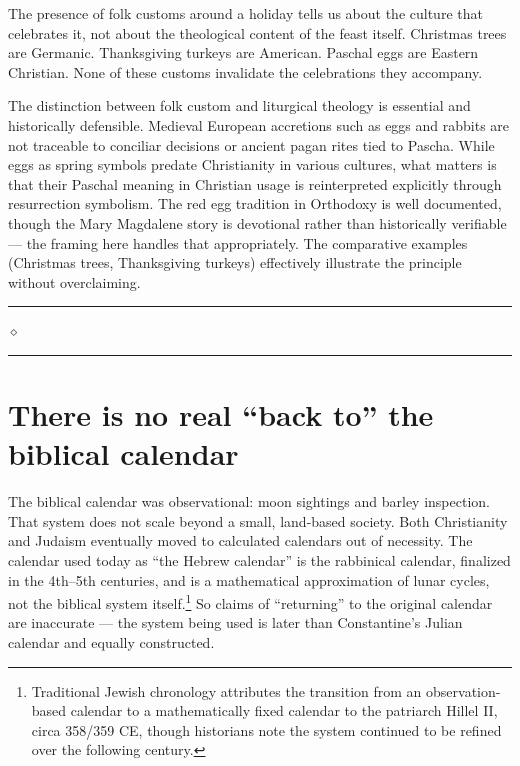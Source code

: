 \documentclass[10pt,twoside,openany]{book}
\newcommand{\ornrule}{%
  \par\bigskip
  {\noindent\hfil{\color{gold}\rule[0.5ex]{1.5in}{0.5pt}%
  \quad$\diamond$\quad%
  \rule[0.5ex]{1.5in}{0.5pt}}\hfil\par}%
  \bigskip
}
\begin{document}
The presence of folk customs around a holiday tells us about the
culture that celebrates it, not about the theological content of the
feast itself. Christmas trees are Germanic. Thanksgiving turkeys are
American. Paschal eggs are Eastern Christian. None of these customs
invalidate the celebrations they accompany.

\begin{gptbox}
The distinction between folk custom and liturgical theology is
essential and historically defensible. Medieval European accretions
such as eggs and rabbits are not traceable to conciliar decisions or
ancient pagan rites tied to Pascha. While eggs as spring symbols
predate Christianity in various cultures, what matters is that their
Paschal meaning in Christian usage is reinterpreted explicitly through
resurrection symbolism. The red egg tradition in Orthodoxy is well
documented, though the Mary Magdalene story is devotional rather than
historically verifiable --- the framing here handles that appropriately.
The comparative examples (Christmas trees, Thanksgiving turkeys)
effectively illustrate the principle without overclaiming.
\end{gptbox}

\ornrule



\section{There is no real ``back to'' the biblical calendar}

The biblical calendar was observational: moon sightings and barley
inspection. That system does not scale beyond a small, land-based
society. Both Christianity and Judaism eventually moved to calculated
calendars out of necessity. The calendar used today as ``the Hebrew
calendar'' is the rabbinical calendar, finalized in the 4th--5th
centuries, and is a mathematical approximation of lunar cycles, not the
biblical system itself.\footnote{Traditional Jewish chronology attributes the transition from an observation-based calendar to a mathematically fixed calendar to the patriarch Hillel II, circa 358/359 CE, though historians note the system continued to be refined over the following century.} So claims of ``returning'' to the original
calendar are inaccurate --- the system being used is later than
Constantine's Julian calendar and equally constructed.
\end{document}
